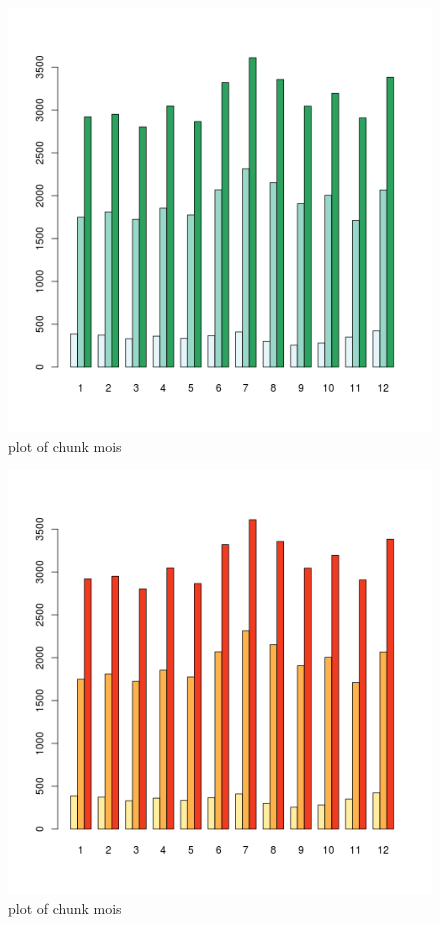 \begin{figure}[htbp]
\centering
\includegraphics{figure/mois4.png}
\caption{plot of chunk mois}
\end{figure}

\begin{Shaded}
\begin{Highlighting}[]

  \NormalTok{(}\NormalTok{, }\NormalTok{))}
\end{Highlighting}
\end{Shaded}

\begin{figure}[htbp]
\centering
\includegraphics{figure/mois5.png}
\caption{plot of chunk mois}
\end{figure}

